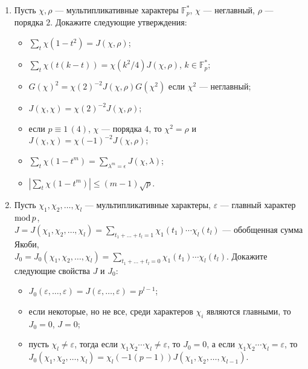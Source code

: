 \begin{enumerate}[topsep=0pt]
    \item Пусть $\chi, \rho$ --- мультипликативные характеры $\mathbb{F}_p^*$, $\chi$ --- неглавный, $\rho$ --- порядка $2$. Докажите следующие утверждения:
    \begin{itemize}[topsep=0pt]
        \item $\sum_t \chi(1-t^2)=J(\chi,\rho)$; %
        \item $\sum_t \chi(t(k-t))=\chi(k^2/4)J(\chi,\rho)$, $k\in\mathbb{F}_p^*$; %
        \item $G(\chi)^2=\chi(2)^{-2}J(\chi,\rho) G(\chi^2)$ если $\chi^2$ --- неглавный; %
        \item $J(\chi,\chi)=\chi(2)^{-2}J(\chi,\rho)$; %
        \item если $p\equiv 1\, (4)$, $\chi$ --- порядка $4$, то $\chi^2=\rho$ и $J(\chi,\chi)=\chi(-1)^{-2}J(\chi,\rho)$; %
        \item $\sum_t \chi(1-t^m) = \sum_{\lambda^m=\epsilon} J(\chi,\lambda)$; %
        \item $|\sum_t \chi(1-t^m)| \leqslant (m-1) \sqrt{p}$. %
    \end{itemize}

    \item Пусть $\chi_1, \chi_2, \dots, \chi_l$ --- мультипликативные характеры, $\varepsilon$ --- главный характер $\operatorname{mod} p$,\\ $J = J(\chi_1, \chi_2, \dots, \chi_l) = \sum\limits_{t_1+\dots+t_l=1} \chi_1(t_1) \cdots \chi_l(t_l)$ --- обобщенная сумма Якоби,\\ $J_0 = J_0(\chi_1, \chi_2, \dots, \chi_l) = \sum\limits_{t_1+\dots+t_l=0} \chi_1(t_1) \cdots \chi_l(t_l)$. Докажите следующие свойства $J$ и $J_0$:
    \begin{itemize}[noitemsep,topsep=0pt]
        \item $J_0(\varepsilon, \dots, \varepsilon) = J(\varepsilon, \dots, \varepsilon) = p^{l-1}$;
        \item если некоторые, но не все, среди характеров $\chi_i$ являются главными, то $J_0 = 0$, $J = 0$;
        \item пусть $\chi_l \neq \varepsilon$, тогда если $\chi_1 \chi_2 \cdots \chi_l \neq \varepsilon$, то $J_0 = 0$, а если $\chi_1 \chi_2 \cdots \chi_l = \varepsilon$, то $J_0 (\chi_1, \chi_2, \dots, \chi_l)= \chi_l(-1(p-1))J(\chi_1, \chi_2, \dots, \chi_{l-1})$.
    \end{itemize} %


\end{enumerate}
